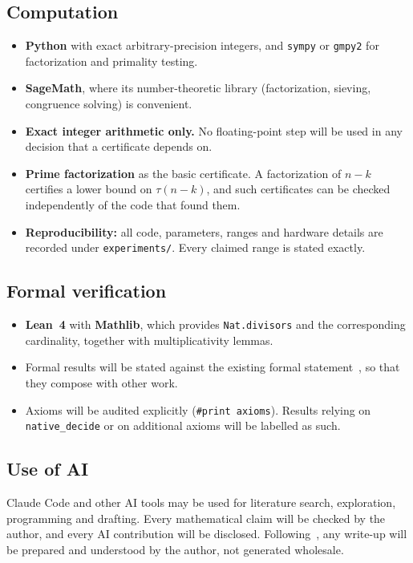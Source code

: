 \documentclass[11pt]{amsart}
\theoremstyle{plain}
\theoremstyle{definition}
\theoremstyle{remark}
\numberwithin{equation}{section}
\begin{document}
\subsection{Computation}
\begin{itemize}
  \item \textbf{Python} with exact arbitrary-precision integers, and \texttt{sympy} or \texttt{gmpy2} for factorization and primality testing.
  \item \textbf{SageMath}, where its number-theoretic library (factorization, sieving, congruence solving) is convenient.
  \item \textbf{Exact integer arithmetic only.} No floating-point step will be used in any decision that a certificate depends on.
  \item \textbf{Prime factorization} as the basic certificate. A factorization of $n-k$ certifies a lower bound on $\tau(n-k)$, and such certificates can be checked independently of the code that found them.
  \item \textbf{Reproducibility:} all code, parameters, ranges and hardware details are recorded under \texttt{experiments/}. Every claimed range is stated exactly.
\end{itemize}

\subsection{Formal verification}
\begin{itemize}
  \item \textbf{Lean~4} with \textbf{Mathlib}, which provides \texttt{Nat.divisors} and the corresponding cardinality, together with multiplicativity lemmas.
  \item Formal results will be stated against the existing formal statement~\cite{FormalConjectures647}, so that they compose with other work.
  \item Axioms will be audited explicitly (\texttt{\#print axioms}). Results relying on \texttt{native\_decide} or on additional axioms will be labelled as such.
\end{itemize}

\subsection{Use of AI}
Claude Code and other AI tools may be used for literature search, exploration, programming and drafting. Every mathematical claim will be checked by the author, and every AI contribution will be disclosed. Following~\cite{BloomChanges2026}, any write-up will be prepared and understood by the author, not generated wholesale.
\end{document}
